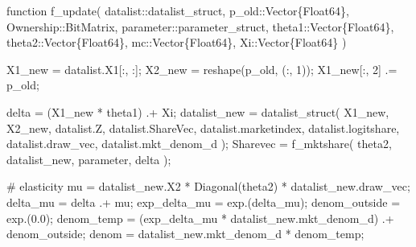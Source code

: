 \documentclass[
  letterpaper,
  DIV=11,
  numbers=noendperiod]{scrreprt}
\newenvironment{Shaded}{\begin{snugshade}}{\end{snugshade}}
\newcommand{\CharTok}[1]{\textcolor[rgb]{0.13,0.47,0.30}{#1}}
\newcommand{\CommentTok}[1]{\textcolor[rgb]{0.37,0.37,0.37}{#1}}
\newcommand{\DataTypeTok}[1]{\textcolor[rgb]{0.68,0.00,0.00}{#1}}
\newcommand{\FloatTok}[1]{\textcolor[rgb]{0.68,0.00,0.00}{#1}}
\newcommand{\FunctionTok}[1]{\textcolor[rgb]{0.28,0.35,0.67}{#1}}
\newcommand{\KeywordTok}[1]{\textcolor[rgb]{0.00,0.23,0.31}{#1}}
\newcommand{\NormalTok}[1]{\textcolor[rgb]{0.00,0.23,0.31}{#1}}
\newcommand{\OperatorTok}[1]{\textcolor[rgb]{0.37,0.37,0.37}{#1}}
\begin{document}
\begin{Shaded}
\begin{Highlighting}[]
\KeywordTok{function} \FunctionTok{f\_update}\NormalTok{(}
\NormalTok{        datalist}\OperatorTok{::}\DataTypeTok{datalist\_struct}\NormalTok{,}
\NormalTok{        p\_old}\OperatorTok{::}\DataTypeTok{Vector\{Float64\}}\NormalTok{,}
\NormalTok{        Ownership}\OperatorTok{::}\DataTypeTok{BitMatrix}\NormalTok{,}
\NormalTok{        parameter}\OperatorTok{::}\DataTypeTok{parameter\_struct}\NormalTok{,}
\NormalTok{        theta1}\OperatorTok{::}\DataTypeTok{Vector\{Float64\}}\NormalTok{,}
\NormalTok{        theta2}\OperatorTok{::}\DataTypeTok{Vector\{Float64\}}\NormalTok{,}
\NormalTok{        mc}\OperatorTok{::}\DataTypeTok{Vector\{Float64\}}\NormalTok{,}
\NormalTok{        Xi}\OperatorTok{::}\DataTypeTok{Vector\{Float64\}}
\NormalTok{    )}
    
\NormalTok{    X1\_new }\OperatorTok{=}\NormalTok{ datalist.X1[}\OperatorTok{:}\NormalTok{, }\OperatorTok{:}\NormalTok{];}
\NormalTok{    X2\_new }\OperatorTok{=} \FunctionTok{reshape}\NormalTok{(p\_old, (}\OperatorTok{:}\NormalTok{, }\FloatTok{1}\NormalTok{));}
\NormalTok{    X1\_new[}\OperatorTok{:}\NormalTok{, }\FloatTok{2}\NormalTok{] }\OperatorTok{.=}\NormalTok{ p\_old;}
    
\NormalTok{    delta }\OperatorTok{=}\NormalTok{ (X1\_new }\OperatorTok{*}\NormalTok{ theta1) }\OperatorTok{.+}\NormalTok{ Xi;}
\NormalTok{    datalist\_new }\OperatorTok{=} \FunctionTok{datalist\_struct}\NormalTok{(}
\NormalTok{        X1\_new, X2\_new, datalist.Z, datalist.ShareVec, datalist.marketindex, }
\NormalTok{        datalist.logitshare, datalist.draw\_vec, datalist.mkt\_denom\_d}
\NormalTok{        );}
\NormalTok{    Sharevec }\OperatorTok{=} \FunctionTok{f\_mktshare}\NormalTok{(}
\NormalTok{        theta2, datalist\_new, parameter, delta}
\NormalTok{    );}
    
    \CommentTok{\# elasticity}
\NormalTok{    mu }\OperatorTok{=}\NormalTok{ datalist\_new.X2 }\OperatorTok{*} \FunctionTok{Diagonal}\NormalTok{(theta2) }\OperatorTok{*}\NormalTok{ datalist\_new.draw\_vec;}
\NormalTok{    delta\_mu }\OperatorTok{=}\NormalTok{ delta }\OperatorTok{.+}\NormalTok{ mu;}
\NormalTok{    exp\_delta\_mu }\OperatorTok{=} \FunctionTok{exp}\NormalTok{.(delta\_mu);}
\NormalTok{    denom\_outside }\OperatorTok{=} \FunctionTok{exp}\NormalTok{.(}\FloatTok{0.0}\NormalTok{);}
\NormalTok{    denom\_temp }\OperatorTok{=}\NormalTok{ (exp\_delta\_mu}\OperatorTok{\textquotesingle{}} \OperatorTok{*}\NormalTok{ datalist\_new.mkt\_denom\_d)}\CharTok{\textquotesingle{} .+ denom\_outside;}
\NormalTok{    denom }\OperatorTok{=}\NormalTok{ datalist\_new.mkt\_denom\_d }\OperatorTok{*}\NormalTok{ denom\_temp;}


\end{Highlighting}
\end{Shaded}
\end{document}
